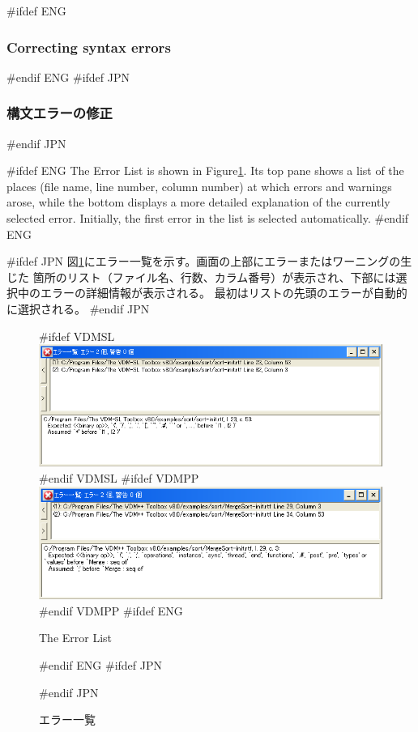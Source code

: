 \documentclass[\pformat,12pt]{article}
\newcommand{\guicmd}[1]{{\sf #1}}
\newcommand{\guicmd}[1]{{\gt #1}}
\begin{document}
#ifdef ENG
\subsubsection{Correcting syntax errors}
#endif ENG
#ifdef JPN
\subsubsection{構文エラーの修正}
#endif JPN

#ifdef ENG
The \guicmd{Error List} is shown in Figure\ref{fig:error}. Its top
pane shows a list of the places (file name, line number, column
number) at which errors and warnings arose, while the bottom
displays a more detailed explanation of the currently selected
error. Initially, the first error in the list is selected
automatically.
#endif ENG

#ifdef JPN
図\ref{fig:error}に\guicmd{エラー一覧}を示す。画面の上部にエラーまたはワーニングの生じた
箇所のリスト（ファイル名、行数、カラム番号）が表示され、下部には選択中のエラーの詳細情報が表示される。
最初はリストの先頭のエラーが自動的に選択される。
#endif JPN

\begin{figure}[tbh]
\begin{center}
#ifdef VDMSL
\includegraphics[width=\textwidth]{errorList-sl.png}
#endif VDMSL
#ifdef VDMPP
\includegraphics[width=\textwidth]{errorList-pp.png}
#endif VDMPP
#ifdef ENG
\caption{The Error List}
#endif ENG
#ifdef JPN
\caption{エラー一覧}
#endif JPN
\label{fig:error}
\end{center}
\end{figure}
\end{document}
